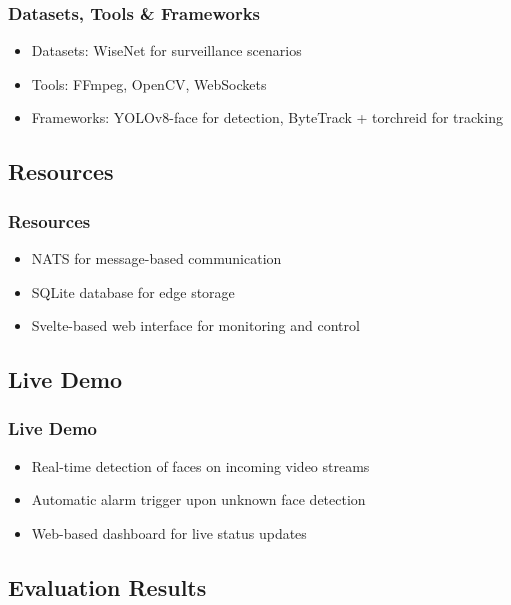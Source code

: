 \documentclass[11pt,t,usepdftitle=false,aspectratio=169]{beamer}
\begin{document}
\begin{frame}
\frametitle{Datasets, Tools \& Frameworks}
\begin{itemize}
	\item Datasets: WiseNet for surveillance scenarios
	\item Tools: FFmpeg, OpenCV, WebSockets
	\item Frameworks: YOLOv8-face for detection, ByteTrack + torchreid for tracking
\end{itemize}
\end{frame}

\subsection{Resources}

\begin{frame}
\frametitle{Resources}
\begin{itemize}
	\item NATS for message-based communication
	\item SQLite database for edge storage
	\item Svelte-based web interface for monitoring and control
\end{itemize}
\end{frame}

\subsection{Live Demo}

\begin{frame}
\frametitle{Live Demo}
\begin{itemize}
	\item Real-time detection of faces on incoming video streams
	\item Automatic alarm trigger upon unknown face detection
	\item Web-based dashboard for live status updates
\end{itemize}
\end{frame}

\subsection{Evaluation Results}
\end{document}
